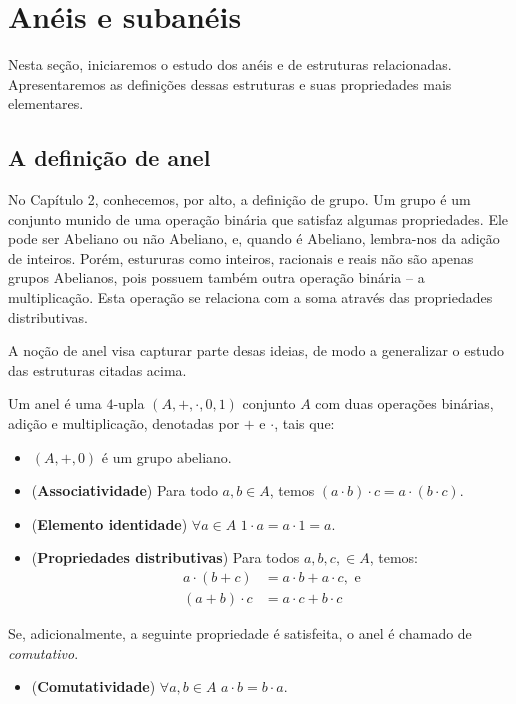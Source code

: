 \chapter{Anéis e subanéis}
Nesta seção, iniciaremos o estudo dos anéis e de estruturas relacionadas. Apresentaremos as definições dessas estruturas e suas propriedades mais elementares.

\section{A definição de anel}
No Capítulo 2, conhecemos, por alto, a definição de grupo.
Um grupo é um conjunto munido de uma operação binária que satisfaz algumas propriedades.
Ele pode ser Abeliano ou não Abeliano, e, quando é Abeliano, lembra-nos da adição de inteiros.
Porém, estururas como inteiros, racionais e reais não são apenas grupos Abelianos, pois possuem também outra operação binária -- a multiplicação.
Esta operação se relaciona com a soma através das propriedades distributivas.

A noção de anel visa capturar parte desas ideias, de modo a generalizar o estudo das estruturas citadas acima.
\begin{definition}[Anel]
    Um anel é uma $4$-upla $(A, +, \cdot, 0, 1)$ conjunto $A$ com duas operações binárias, adição e multiplicação, denotadas por $+$ e $\cdot$, tais que:
    \begin{itemize}
        \item $(A, +, 0)$ é um grupo abeliano.
        \item (\textbf{Associatividade}) Para todo $a, b \in A$, temos $(a \cdot b)\cdot c = a\cdot(b\cdot c)$.
        \item (\textbf{Elemento identidade}) $\forall a \in A$ $1 \cdot a = a \cdot 1 = a$.
        \item (\textbf{Propriedades distributivas}) Para todos $a, b, c, \in A$, temos:
        \begin{align*}
            a \cdot (b + c) &= a \cdot b + a \cdot c, \text{ e}\\
            (a + b) \cdot c &= a \cdot c + b \cdot c
        \end{align*}
    \end{itemize}
    Se, adicionalmente, a seguinte propriedade é satisfeita, o anel é chamado de \emph{comutativo}.
    \begin{itemize}
        \item (\textbf{Comutatividade}) $\forall a, b \in A$ $a \cdot b = b \cdot a$.
    \end{itemize}
\end{definition}

